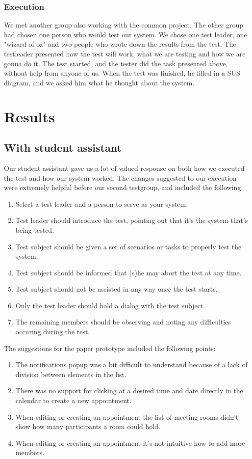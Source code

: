 \documentclass{article}
\begin{document}
\subsubsection*{Execution}
We met another group also working with the common project. The other group had chosen one person who would test our system. We chose one test leader, one "wizard of oz" and two people who wrote down the results from the test. The testleader presented how the test will work, what we are testing and how we are gonna do it. The test started, and the tester did the task presented above, without help from anyone of us. When the test was finished, he filled in a SUS diagram, and we asked him what he thought about the system.

\section{Results}
\subsection{With student assistant}
Our student assistant gave us a lot of valued response on both how we executed the test and how our system worked. The changes suggested to our execution were extremely helpful before our second testgroup, and included the following:
\begin{enumerate}
\item Select a test leader and a person to serve as your system.
\item Test leader should introduce the test, pointing out that it's the system that's being tested. 
\item Test subject should be given a set of scenarios or tasks to properly test the system. 
\item Test subject should be informed that (s)he may abort the test at any time.
\item Test subject should not be assisted in any way once the test starts.
\item Only the test leader should hold a dialog with the test subject.
\item The remaining members should be observing and noting any difficulties occuring during the test.
\end{enumerate}

The suggestions for the paper prototype included the following points:
\begin{enumerate}
\item The notifications popup was a bit difficult to understand because of a lack of division between elements in the list.
\item There was no support for clicking at a desired time and date directly in the calendar to create a new appointment.
\item When editing or creating an appointment the list of meeting rooms didn't show how many participants a room could hold.
\item When editing or creating an appointment it's not intuitive how to add more members.
\end{enumerate}
\end{document}
